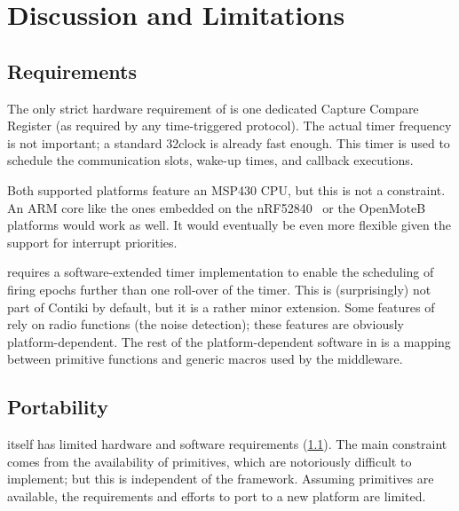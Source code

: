 \vspace{-1cm}
\section{Discussion and Limitations}
\label{sec:requirements}


\subsection{Requirements}
\label{subsec:requirements}
The only strict hardware requirement of \baloo is one dedicated Capture Compare Register (as required by any time-triggered protocol). The actual timer frequency is not important; a standard 32\kHz clock is already fast enough.
This timer is used to schedule the communication slots, wake-up times, and callback executions.

Both supported platforms feature an MSP430 CPU, but this is not a constraint. An ARM core like the ones embedded on the nRF52840~\cite{nRF52840} or the OpenMoteB~\cite{OpenMoteB} platforms would work as well. It would eventually be even more flexible given the support for interrupt priorities.

\baloo requires a software-extended timer implementation to enable the scheduling of firing epochs further than one roll-over of the timer. This is (surprisingly) not part of Contiki by default, but it is a rather minor extension.
%
Some features of \baloo rely on radio functions (\eg the noise detection); these features are obviously platform-dependent.
%
The rest of the platform-dependent software in \baloo is a mapping between \ST primitive functions and generic macros used by the middleware.

\subsection{Portability}
\baloo itself has limited hardware and software requirements (\cref{subsec:requirements}). The main constraint comes from the availability of \ST primitives, which are notoriously difficult to implement; but this is independent of the framework.
Assuming \ST primitives are available, the requirements and efforts to port \baloo to a new platform are limited.

